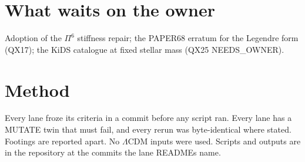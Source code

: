 \documentclass[10pt]{article}
\begin{document}
\section{What waits on the owner}
Adoption of the $\Pi^6$ stiffness repair; the PAPER68 erratum for the Legendre form (QX17); the KiDS catalogue at fixed stellar mass (QX25 NEEDS\_OWNER).

\section*{Method}
Every lane froze its criteria in a commit before any script ran. Every lane has a MUTATE twin that must fail, and every rerun was byte-identical where stated. Footings are reported apart. No $\Lambda$CDM inputs were used. Scripts and outputs are in the repository at the commits the lane READMEs name.
\end{document}
